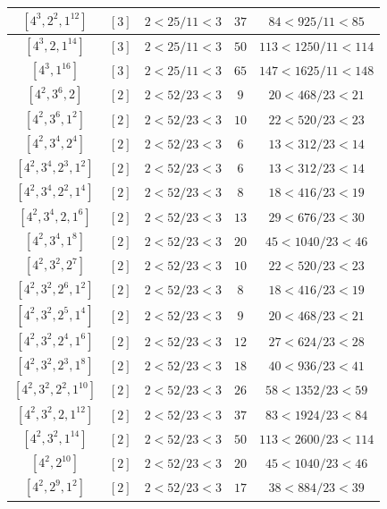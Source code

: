 \documentclass{article}%
\begin{document}
\begin{center}
\begin{longtable}{||c|c|c|c|c||}
$[4^{3}, 2^{2}, 1^{12}]$ & $[3]$ & $2 < 25/11 < 3$ & $37$ & $84 < 925/11 < 85$ \\ \hline 
$[4^{3}, 2, 1^{14}]$ & $[3]$ & $2 < 25/11 < 3$ & $50$ & $113 < 1250/11 < 114$ \\ \hline 
$[4^{3}, 1^{16}]$ & $[3]$ & $2 < 25/11 < 3$ & $65$ & $147 < 1625/11 < 148$ \\ \hline 
$[4^{2}, 3^{6}, 2]$ & $[2]$ & $2 < 52/23 < 3$ & $9$ & $20 < 468/23 < 21$ \\ \hline 
$[4^{2}, 3^{6}, 1^{2}]$ & $[2]$ & $2 < 52/23 < 3$ & $10$ & $22 < 520/23 < 23$ \\ \hline 
$[4^{2}, 3^{4}, 2^{4}]$ & $[2]$ & $2 < 52/23 < 3$ & $6$ & $13 < 312/23 < 14$ \\ \hline 
$[4^{2}, 3^{4}, 2^{3}, 1^{2}]$ & $[2]$ & $2 < 52/23 < 3$ & $6$ & $13 < 312/23 < 14$ \\ \hline 
$[4^{2}, 3^{4}, 2^{2}, 1^{4}]$ & $[2]$ & $2 < 52/23 < 3$ & $8$ & $18 < 416/23 < 19$ \\ \hline 
$[4^{2}, 3^{4}, 2, 1^{6}]$ & $[2]$ & $2 < 52/23 < 3$ & $13$ & $29 < 676/23 < 30$ \\ \hline 
$[4^{2}, 3^{4}, 1^{8}]$ & $[2]$ & $2 < 52/23 < 3$ & $20$ & $45 < 1040/23 < 46$ \\ \hline 
$[4^{2}, 3^{2}, 2^{7}]$ & $[2]$ & $2 < 52/23 < 3$ & $10$ & $22 < 520/23 < 23$ \\ \hline 
$[4^{2}, 3^{2}, 2^{6}, 1^{2}]$ & $[2]$ & $2 < 52/23 < 3$ & $8$ & $18 < 416/23 < 19$ \\ \hline 
$[4^{2}, 3^{2}, 2^{5}, 1^{4}]$ & $[2]$ & $2 < 52/23 < 3$ & $9$ & $20 < 468/23 < 21$ \\ \hline 
$[4^{2}, 3^{2}, 2^{4}, 1^{6}]$ & $[2]$ & $2 < 52/23 < 3$ & $12$ & $27 < 624/23 < 28$ \\ \hline 
$[4^{2}, 3^{2}, 2^{3}, 1^{8}]$ & $[2]$ & $2 < 52/23 < 3$ & $18$ & $40 < 936/23 < 41$ \\ \hline 
$[4^{2}, 3^{2}, 2^{2}, 1^{10}]$ & $[2]$ & $2 < 52/23 < 3$ & $26$ & $58 < 1352/23 < 59$ \\ \hline 
$[4^{2}, 3^{2}, 2, 1^{12}]$ & $[2]$ & $2 < 52/23 < 3$ & $37$ & $83 < 1924/23 < 84$ \\ \hline 
$[4^{2}, 3^{2}, 1^{14}]$ & $[2]$ & $2 < 52/23 < 3$ & $50$ & $113 < 2600/23 < 114$ \\ \hline 
$[4^{2}, 2^{10}]$ & $[2]$ & $2 < 52/23 < 3$ & $20$ & $45 < 1040/23 < 46$ \\ \hline 
$[4^{2}, 2^{9}, 1^{2}]$ & $[2]$ & $2 < 52/23 < 3$ & $17$ & $38 < 884/23 < 39$ \\ \hline 

\end{longtable}
\end{center}
\end{document}
